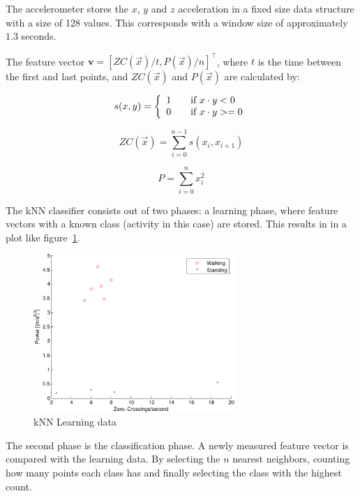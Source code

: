 \documentclass[journal]{IEEEtran}
\let\MYoriglatexcaption\caption
\renewcommand{\caption}[2][\relax]{\MYoriglatexcaption[#2]{#2}}
\begin{document}
The accelerometer stores the $x$, $y$ and $z$ acceleration in a fixed size
data structure with a size of 128 values. This corresponds with a window size
of approximately $1.3$ seconds.

The feature vector $\mathbf{v} = [ZC(\vec x) / t, P(\vec x)/ n]^\intercal$,
where $t$ is the time between the first and last points, and $ZC(\vec x)$ and
$P(\vec x)$ are calculated by:

\begin{equation}
  s(x,y) = \left\{
    \begin{array}{l l}
      1 & \quad \text{if~} x \cdot y < 0 \\
      0 & \quad \text{if~} x \cdot y >= 0
  \end{array} \right.
\end{equation}

\begin{equation}
  ZC(\vec x) = \sum^{n-1}_{i=0} s(x_i, x_{i+1})
\end{equation}

\begin{equation}
  P = \sum^{n}_{i=0} x_i^2
\end{equation}

The kNN classifier consists out of two phases: a learning phase, where feature
vectors with a known class (activity in this case) are stored. This results in
in a plot like figure~\ref{fig:knn-data}.

\begin{figure}
  \centering
  \includegraphics[width=3in]{images/knn-data.pdf}
  \caption{kNN Learning data}
  \label{fig:knn-data}
\end{figure}

The second phase is the classification phase. A newly measured feature vector
is compared with the learning data. By selecting the $n$ nearest neighbors,
counting how many points each class has and finally selecting the class with
the highest count.
\end{document}
